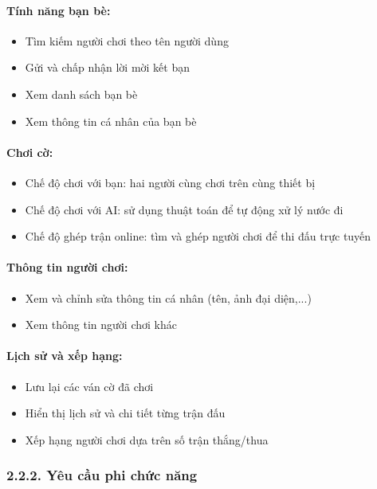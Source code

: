 \documentclass[a4paper,12pt]{article}
\begin{document}
\paragraph{Tính năng bạn bè:} %
\begin{itemize}[label=·]
    \item Tìm kiếm người chơi theo tên người dùng
    \item Gửi và chấp nhận lời mời kết bạn
    \item Xem danh sách bạn bè
    \item Xem thông tin cá nhân của bạn bè
\end{itemize}

\paragraph{Chơi cờ:} %
\begin{itemize}[label=·]
    \item Chế độ chơi với bạn: hai người cùng chơi trên cùng thiết bị
    \item Chế độ chơi với AI: sử dụng thuật toán để tự động xử lý nước đi
    \item Chế độ ghép trận online: tìm và ghép người chơi để thi đấu trực tuyến
\end{itemize}

\paragraph{Thông tin người chơi:} %
\begin{itemize}[label=·]
    \item Xem và chỉnh sửa thông tin cá nhân (tên, ảnh đại diện,...)
    \item Xem thông tin người chơi khác
\end{itemize}

\paragraph{Lịch sử và xếp hạng:} %
\begin{itemize}[label=·]
    \item Lưu lại các ván cờ đã chơi
    \item Hiển thị lịch sử và chi tiết từng trận đấu
    \item Xếp hạng người chơi dựa trên số trận thắng/thua
\end{itemize}

\subsubsection*{2.2.2. Yêu cầu phi chức năng} %
\end{document}
